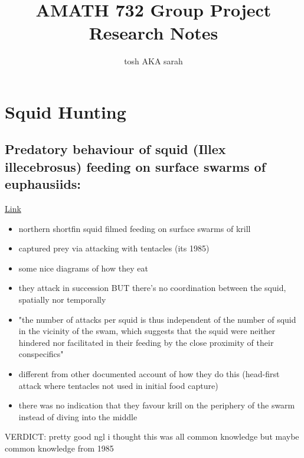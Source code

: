 \documentclass[12pt]{article}
\begin{document}
\title{AMATH 732 Group Project Research Notes}
\author{tosh AKA sarah}
\maketitle

\tableofcontents
\newpage

\section{Squid Hunting}

\subsection{Predatory behaviour of squid (Illex illecebrosus) feeding on surface swarms of euphausiids: \cite{nicol}}
\href{https://doi.org/10.1139/z85-003}{Link} \\
\begin{itemize}
    \item northern shortfin squid filmed feeding on surface swarms of krill
    \item captured prey via attacking with tentacles (its 1985)
    \item some nice diagrams of how they eat
    \item they attack in succession BUT there's no coordination between the squid, spatially nor temporally
    \item "the number of attacks per squid is thus independent of the number of squid in the vicinity of the swam, which suggests that the squid were neither hindered nor facilitated in their feeding by the close proximity of their conspecifics"
    \item different from other documented account of how they do this (head-first attack where tentacles not used in initial food capture)
    \item there was no indication that they favour krill on the periphery of the swarm instead of diving into the middle
\end{itemize}
VERDICT: pretty good ngl i thought this was all common knowledge but maybe common knowledge from 1985
\end{document}
